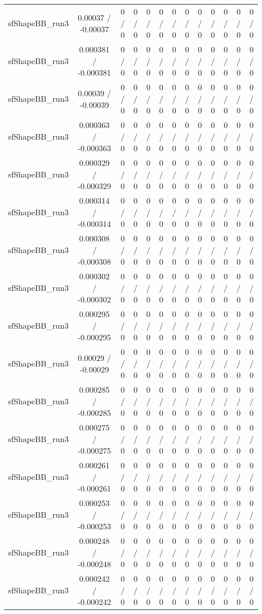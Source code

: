 \documentclass[10pt]{article}
\begin{document}
\begin{table}[htbp]
\begin{center}
\begin{tabular}{|c|c|c|c|c|c|c|c|c|c|c|c|c|}
  sfShapeBB_run3 & 0.00037 / -0.00037 & 0 / 0 & 0 / 0 & 0 / 0 & 0 / 0 & 0 / 0 & 0 / 0 & 0 / 0 & 0 / 0 & 0 / 0 & 0 / 0 & 0 / 0 \\ 
  sfShapeBB_run3 & 0.000381 / -0.000381 & 0 / 0 & 0 / 0 & 0 / 0 & 0 / 0 & 0 / 0 & 0 / 0 & 0 / 0 & 0 / 0 & 0 / 0 & 0 / 0 & 0 / 0 \\ 
  sfShapeBB_run3 & 0.00039 / -0.00039 & 0 / 0 & 0 / 0 & 0 / 0 & 0 / 0 & 0 / 0 & 0 / 0 & 0 / 0 & 0 / 0 & 0 / 0 & 0 / 0 & 0 / 0 \\ 
  sfShapeBB_run3 & 0.000363 / -0.000363 & 0 / 0 & 0 / 0 & 0 / 0 & 0 / 0 & 0 / 0 & 0 / 0 & 0 / 0 & 0 / 0 & 0 / 0 & 0 / 0 & 0 / 0 \\ 
  sfShapeBB_run3 & 0.000329 / -0.000329 & 0 / 0 & 0 / 0 & 0 / 0 & 0 / 0 & 0 / 0 & 0 / 0 & 0 / 0 & 0 / 0 & 0 / 0 & 0 / 0 & 0 / 0 \\ 
  sfShapeBB_run3 & 0.000314 / -0.000314 & 0 / 0 & 0 / 0 & 0 / 0 & 0 / 0 & 0 / 0 & 0 / 0 & 0 / 0 & 0 / 0 & 0 / 0 & 0 / 0 & 0 / 0 \\ 
  sfShapeBB_run3 & 0.000308 / -0.000308 & 0 / 0 & 0 / 0 & 0 / 0 & 0 / 0 & 0 / 0 & 0 / 0 & 0 / 0 & 0 / 0 & 0 / 0 & 0 / 0 & 0 / 0 \\ 
  sfShapeBB_run3 & 0.000302 / -0.000302 & 0 / 0 & 0 / 0 & 0 / 0 & 0 / 0 & 0 / 0 & 0 / 0 & 0 / 0 & 0 / 0 & 0 / 0 & 0 / 0 & 0 / 0 \\ 
  sfShapeBB_run3 & 0.000295 / -0.000295 & 0 / 0 & 0 / 0 & 0 / 0 & 0 / 0 & 0 / 0 & 0 / 0 & 0 / 0 & 0 / 0 & 0 / 0 & 0 / 0 & 0 / 0 \\ 
  sfShapeBB_run3 & 0.00029 / -0.00029 & 0 / 0 & 0 / 0 & 0 / 0 & 0 / 0 & 0 / 0 & 0 / 0 & 0 / 0 & 0 / 0 & 0 / 0 & 0 / 0 & 0 / 0 \\ 
  sfShapeBB_run3 & 0.000285 / -0.000285 & 0 / 0 & 0 / 0 & 0 / 0 & 0 / 0 & 0 / 0 & 0 / 0 & 0 / 0 & 0 / 0 & 0 / 0 & 0 / 0 & 0 / 0 \\ 
  sfShapeBB_run3 & 0.000275 / -0.000275 & 0 / 0 & 0 / 0 & 0 / 0 & 0 / 0 & 0 / 0 & 0 / 0 & 0 / 0 & 0 / 0 & 0 / 0 & 0 / 0 & 0 / 0 \\ 
  sfShapeBB_run3 & 0.000261 / -0.000261 & 0 / 0 & 0 / 0 & 0 / 0 & 0 / 0 & 0 / 0 & 0 / 0 & 0 / 0 & 0 / 0 & 0 / 0 & 0 / 0 & 0 / 0 \\ 
  sfShapeBB_run3 & 0.000253 / -0.000253 & 0 / 0 & 0 / 0 & 0 / 0 & 0 / 0 & 0 / 0 & 0 / 0 & 0 / 0 & 0 / 0 & 0 / 0 & 0 / 0 & 0 / 0 \\ 
  sfShapeBB_run3 & 0.000248 / -0.000248 & 0 / 0 & 0 / 0 & 0 / 0 & 0 / 0 & 0 / 0 & 0 / 0 & 0 / 0 & 0 / 0 & 0 / 0 & 0 / 0 & 0 / 0 \\ 
  sfShapeBB_run3 & 0.000242 / -0.000242 & 0 / 0 & 0 / 0 & 0 / 0 & 0 / 0 & 0 / 0 & 0 / 0 & 0 / 0 & 0 / 0 & 0 / 0 & 0 / 0 & 0 / 0 \\ 

\end{tabular}
\end{center}
\end{table}
\end{document}
